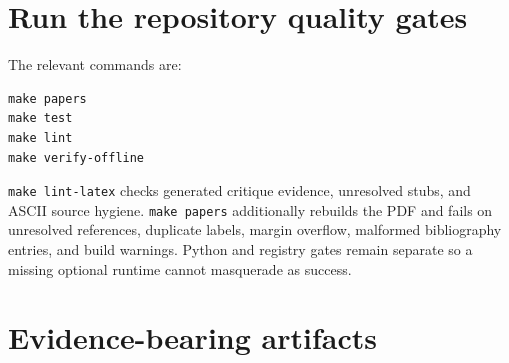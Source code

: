 \section{Run the repository quality gates}

The relevant commands are:

\begin{verbatim}
make papers
make test
make lint
make verify-offline
\end{verbatim}

\texttt{make lint-latex} checks generated critique evidence, unresolved stubs,
and ASCII source hygiene. \texttt{make papers} additionally rebuilds the PDF
and fails on unresolved references, duplicate labels, margin overflow,
malformed bibliography entries, and build warnings. Python and registry gates
remain separate so a missing optional runtime cannot masquerade as success.

\section{Evidence-bearing artifacts}

